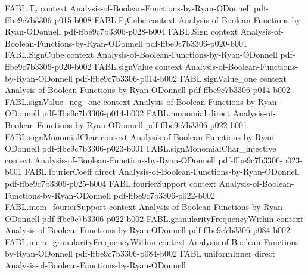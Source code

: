 \begin{theorem}
\label{FABL.oddWeightPartialSumUniformStringTester_acceptance_eq_value}
\leanok
{}
\proofstep
  {FABL.𝔽₂}
  {context}
  {Analysis-of-Boolean-Functions-by-Ryan-ODonnell}
  {pdf-ffbe9c7b3306-p015-b008}
\proofstep
  {FABL.F₂Cube}
  {context}
  {Analysis-of-Boolean-Functions-by-Ryan-ODonnell}
  {pdf-ffbe9c7b3306-p028-b004}
\proofstep
  {FABL.Sign}
  {context}
  {Analysis-of-Boolean-Functions-by-Ryan-ODonnell}
  {pdf-ffbe9c7b3306-p020-b001}
\proofstep
  {FABL.SignCube}
  {context}
  {Analysis-of-Boolean-Functions-by-Ryan-ODonnell}
  {pdf-ffbe9c7b3306-p020-b002}
\proofstep
  {FABL.signValue}
  {context}
  {Analysis-of-Boolean-Functions-by-Ryan-ODonnell}
  {pdf-ffbe9c7b3306-p014-b002}
\proofstep
  {FABL.signValue_one}
  {context}
  {Analysis-of-Boolean-Functions-by-Ryan-ODonnell}
  {pdf-ffbe9c7b3306-p014-b002}
\proofstep
  {FABL.signValue_neg_one}
  {context}
  {Analysis-of-Boolean-Functions-by-Ryan-ODonnell}
  {pdf-ffbe9c7b3306-p014-b002}
\proofstep
  {FABL.monomial}
  {direct}
  {Analysis-of-Boolean-Functions-by-Ryan-ODonnell}
  {pdf-ffbe9c7b3306-p022-b001}
\proofstep
  {FABL.signMonomialChar}
  {context}
  {Analysis-of-Boolean-Functions-by-Ryan-ODonnell}
  {pdf-ffbe9c7b3306-p023-b001}
\proofstep
  {FABL.signMonomialChar_injective}
  {context}
  {Analysis-of-Boolean-Functions-by-Ryan-ODonnell}
  {pdf-ffbe9c7b3306-p023-b001}
\proofstep
  {FABL.fourierCoeff}
  {direct}
  {Analysis-of-Boolean-Functions-by-Ryan-ODonnell}
  {pdf-ffbe9c7b3306-p025-b004}
\proofstep
  {FABL.fourierSupport}
  {context}
  {Analysis-of-Boolean-Functions-by-Ryan-ODonnell}
  {pdf-ffbe9c7b3306-p022-b002}
\proofstep
  {FABL.mem_fourierSupport}
  {context}
  {Analysis-of-Boolean-Functions-by-Ryan-ODonnell}
  {pdf-ffbe9c7b3306-p022-b002}
\proofstep
  {FABL.granularityFrequencyWithin}
  {context}
  {Analysis-of-Boolean-Functions-by-Ryan-ODonnell}
  {pdf-ffbe9c7b3306-p084-b002}
\proofstep
  {FABL.mem_granularityFrequencyWithin}
  {context}
  {Analysis-of-Boolean-Functions-by-Ryan-ODonnell}
  {pdf-ffbe9c7b3306-p084-b002}
\proofstep
  {FABL.uniformInner}
  {direct}
  {Analysis-of-Boolean-Functions-by-Ryan-ODonnell}

\end{theorem}
